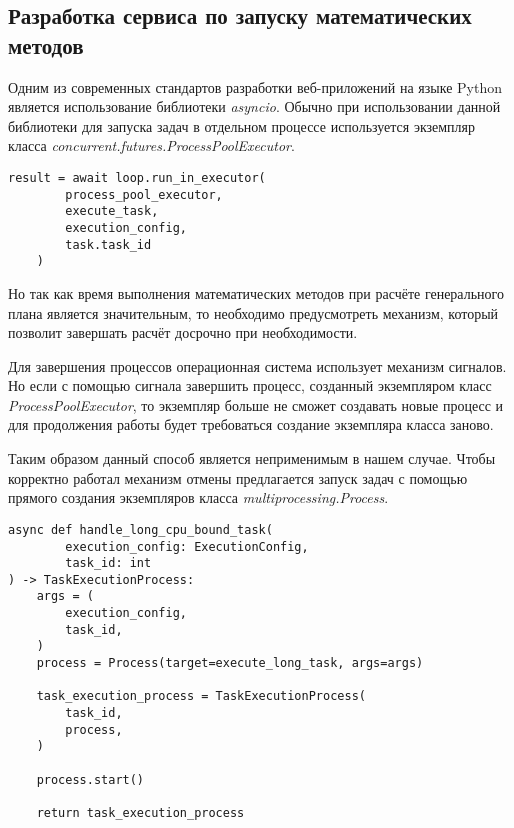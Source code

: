 \subsection{\large{Разработка сервиса по запуску математических методов}}

Одним из современных стандартов разработки веб-приложений на языке Python является использование
библиотеки \textit{asyncio}. Обычно при использовании данной библиотеки для запуска задач в отдельном процессе
используется экземпляр класса \textit{concurrent.futures.ProcessPoolExecutor}.

\begin{lstlisting}[caption={Пример запуска с использованием \textit{ProcessPoolExecutor}},captionpos=b]
    result = await loop.run_in_executor(
        process_pool_executor,
        execute_task,
        execution_config,
        task.task_id
    )
\end{lstlisting}
\vskip 8mm

Но так как время выполнения математических методов при расчёте генерального плана является значительным,
то необходимо предусмотреть механизм, который позволит завершать расчёт досрочно при необходимости.

Для завершения процессов операционная система использует механизм сигналов. Но если с помощью сигнала
завершить процесс, созданный экземпляром класс \textit{ProcessPoolExecutor}, то экземпляр больше не сможет
создавать новые процесс и для продолжения работы будет требоваться создание экземпляра класса заново.

Таким образом данный способ является неприменимым в нашем случае.
Чтобы корректно работал механизм отмены предлагается запуск задач
с помощью прямого создания экземпляров класса \textit{multiprocessing.Process}.

\begin{lstlisting}[caption={Пример запуска с использованием \textit{multiprocessing.Process}},captionpos=b]
async def handle_long_cpu_bound_task(
        execution_config: ExecutionConfig,
        task_id: int
) -> TaskExecutionProcess:
    args = (
        execution_config,
        task_id,
    )
    process = Process(target=execute_long_task, args=args)

    task_execution_process = TaskExecutionProcess(
        task_id,
        process,
    )

    process.start()

    return task_execution_process
\end{lstlisting}
